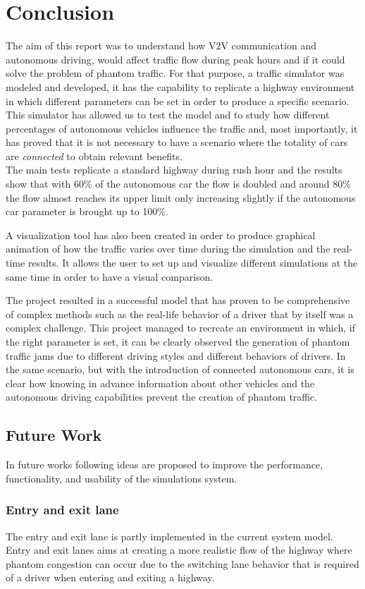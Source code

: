 \section{Conclusion}
\label{sec}
The aim of this report was to understand how V2V communication and autonomous driving, would affect traffic flow during peak hours and if it could solve the problem of phantom traffic. For that purpose, a traffic simulator was modeled and developed, it has the capability to replicate a highway environment in which different parameters can be set in order to produce a specific scenario. 
This simulator has allowed us to test the model and to study how different percentages of autonomous vehicles influence the traffic and, most importantly, it has proved that it is not necessary to have a scenario where the totality of cars are \textit{connected} to obtain relevant benefits. \\
The main tests replicate a standard highway during rush hour and the results show that with 60\% of the autonomous car the flow is doubled and around 80\% the flow almost reaches its upper limit only increasing slightly if the autonomous car parameter is brought up to 100\%. 

A visualization tool has also been created in order to produce graphical animation of how the traffic varies over time during the simulation and the real-time results. It allows the user to set up and visualize different simulations at the same time in order to have a visual comparison. 

The project resulted in a successful model that has proven to be comprehensive of complex methods such as the real-life behavior of a driver that by itself was a complex challenge. This project managed to recreate an environment in which, if the right parameter is set, it can be clearly observed the generation of phantom traffic jams due to different driving styles and different behaviors of drivers.
In the same scenario, but with the introduction of connected autonomous cars, it is clear how knowing in advance information about other vehicles and the autonomous driving capabilities prevent the creation of phantom traffic.

\subsection{Future Work}
In future works following ideas are proposed to improve the performance, functionality, and usability of the simulations system.
\subsubsection{Entry and exit lane}
The entry and exit lane is partly implemented in the current system model. Entry and exit lanes aims at creating a more realistic flow of the highway where phantom congestion can occur due to the switching lane behavior that is required of a driver when entering and exiting a highway. 
